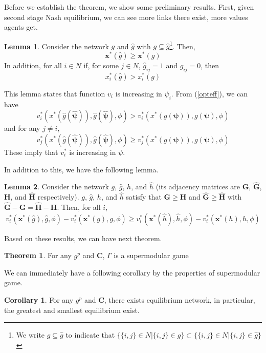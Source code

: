 \documentclass[12pt]{article}
\theoremstyle{definition}
\newtheorem{theorem}{Theorem}
\newtheorem{lemma}{Lemma}
\newtheorem{corollary}{Corollary}
\newcommand{\bm}[1]{\boldsymbol{#1}}
\begin{document}
Before we establish the theorem, we show some preliminary results.
First, given second stage Nash equilibrium, we can see more links there exist, more values agents get.

\begin{lemma}
	Consider the network $g$ and $\hat{g}$ with $g \subseteq \hat{g}$\footnote{We write $g \subseteq \hat{g}$ to indicate that $\{\{i,j\} \in N | \{i,j\} \in g\} \subset \{\{i,j\} \in N | \{i,j\} \in \hat{g}\}$}.
	Then,
	\[ \bm{x}^*(\hat{g}) \ge \bm{x}^*(g) \]
	In addition, for all $i \in N$ if, for some $j \in N$, $\hat{g}_{ij} = 1$ and $g_{ij} = 0$, then
	\[ x_i^*(\hat{g}) > x_i^*(g) \]
\end{lemma}

This lemma states that function $v_i$ is increasing in $\psi_i$.
From (\ref{opteff}), we can have 
\[ v_i^*(x^*(\hat{g}(\bm{\hat{\psi}})), \hat{g}(\bm{\hat{\psi}}), \phi) > v_i^*(x^*(g(\bm{\psi})), g(\bm{\psi}), \phi)\]
and for any $j \neq i$,
\[ v_j^*(x^*(\hat{g}(\bm{\hat{\psi}})), \hat{g}(\bm{\hat{\psi}}), \phi) \ge v_j^*(x^*(g(\bm{\psi})), g(\bm{\psi}), \phi)\]
These imply that $v_i^*$ is increasing in $\psi$.

In addition to this, we have the following lemma.

\begin{lemma}
	Consider the network $g$, $\hat{g}$, $h$, and $\hat{h}$ (its adjacency matrices are $\bm{G}$, $\bm{\hat{G}}$, $\bm{H}$, and $\bm{\hat{H}}$ respectively).
	$g$, $\hat{g}$, $h$, and $\hat{h}$ satisfy that $\bm{G} \ge \bm{H}$ and  $\bm{\hat{G}} \ge \bm{\hat{H}}$ with $\bm{\hat{G}} - \bm{G} = \bm{\hat{H}} - \bm{H}$.
	Then, for all $i$,
	\[ v_i^*(\bm{x}^*(\hat{g}), \hat{g}, \phi) - v_i^*(\bm{x}^*(g), g, \phi) \ge v_i^*(\bm{x}^*(\hat{h}), \hat{h}, \phi) - v_i^*(\bm{x}^*(h), h, \phi)\]
\end{lemma}

Based on these results, we can have next theorem.

\begin{theorem}
	For any $g^p$ and $\bm{C}$, $\Gamma$ is a supermodular game
\end{theorem}

We can immediately have a following corollary by the properties of supermodular game.

\begin{corollary}
	For any $g^p$ and $\bm{C}$, there exists equilibrium network, in particular, the greatest and smallest equilibrium exist.
\end{corollary}
\end{document}
